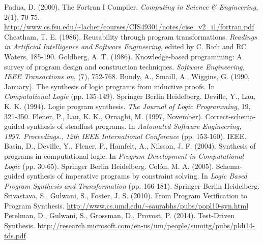\documentclass[a4paper,twoside,notitlepage]{article}
\begin{document}
\clearpage
\begin{thebibliography}{9}
        Padua, D. (2000). The Fortran I Compiler.
        \emph{Computing in Science \& Engineering}, 2(1), 70-75.
        \url{http://www.cs.fsu.edu/~lacher/courses/CIS49301/notes/cise_v2_i1/fortran.pdf}
        Cheatham, T. E. (1986). Reusability through program transformations. 
        \emph{Readings in Artificial Intelligence and Software Engineering}, 
        edited by C. Rich and RC Waters, 185-190.
        Goldberg, A. T. (1986). Knowledge-based programming:
        A survey of program design and construction techniques.
        \emph{Software Engineering, IEEE Transactions on}, (7), 752-768.
        Bundy, A., Smaill, A., Wiggins, G. (1990, January).
        The synthesis of logic programs from inductive proofs.
        In \emph{Computational Logic} (pp. 135-149). Springer Berlin Heidelberg.
        Deville, Y., Lau, K. K. (1994). Logic program synthesis.
        \emph{The Journal of Logic Programming}, 19, 321-350.
        Flener, P., Lau, K. K., Ornaghi, M. (1997, November). 
        Correct-schema-guided synthesis of steadfast programs.
        In \emph{Automated Software Engineering, 1997.
        Proceedings., 12th IEEE International Conference} (pp. 153-160). IEEE.
        Basin, D., Deville, Y., Flener, P., Hamfelt, A., Nilsson, J. F. (2004).
        Synthesis of programs in computational logic.
        In \emph{Program Development in Computational Logic} (pp. 30-65).
        Springer Berlin Heidelberg.
        Colón, M. A. (2005). Schema-guided synthesis of imperative programs by 
        constraint solving. In \emph{Logic Based Program Synthesis and 
        Transformation} (pp. 166-181). Springer Berlin Heidelberg.
        Srivastava, S., Gulwani, S., Foster, J. S. (2010).
        From Program Verification to Program Synthesis.
        \url{http://www.cs.umd.edu/~saurabhs/pubs/popl10-syn.html}
        Perelman, D., Gulwani, S., Grossman, D., Provost, P. (2014).
        Test-Driven Synthesis.
        \url{http://research.microsoft.com/en-us/um/people/sumitg/pubs/pldi14-tds.pdf}
\begin{comment}
    \bibitem{muggleton94}
        Muggleton, S., De Raedt, L. (1994).
        Inductive Logic Programming: Theory and methods.
        The Journal of Logic Programming, vol. 19-20, page 629-679.
    \bibitem{potassco}

\end{comment}
\end{thebibliography}
\end{document}
